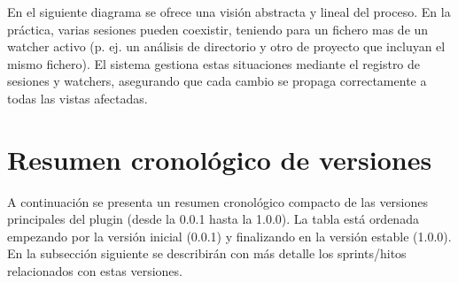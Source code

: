 \documentclass[a4paper, 12pt]{book}
\begin{document}
\noindent En el siguiente diagrama se ofrece una visión abstracta y lineal del proceso. En la práctica, varias sesiones pueden coexistir, teniendo para un fichero mas de un watcher activo (p. ej. un análisis de directorio y otro de proyecto que incluyan el mismo fichero). El sistema gestiona estas situaciones mediante el registro de sesiones y watchers, asegurando que cada cambio se propaga correctamente a todas las vistas afectadas.

\section{Resumen cronológico de versiones}
\label{sec:resumen-versiones}
A continuación se presenta un resumen cronológico compacto de las versiones principales del plugin (desde la 0.0.1 hasta la 1.0.0). La tabla está ordenada empezando por la versión inicial (0.0.1) y finalizando en la versión estable (1.0.0). En la subsección siguiente se describirán con más detalle los sprints/hitos relacionados con estas versiones.
\end{document}
